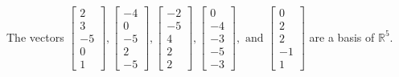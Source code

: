 \begin{exercise}
\begin{exerciseStatement}
  \end{exerciseStatement}
  \begin{exerciseAnswer}
   The vectors \(\left[\begin{array}{r}
2 \\
3 \\
-5 \\
0 \\
1
\end{array}\right] , \left[\begin{array}{r}
-4 \\
0 \\
-5 \\
2 \\
-5
\end{array}\right] , \left[\begin{array}{r}
-2 \\
-5 \\
4 \\
2 \\
2
\end{array}\right] , \left[\begin{array}{r}
0 \\
-4 \\
-3 \\
-5 \\
-3
\end{array}\right] , \text{ and } \left[\begin{array}{r}
0 \\
2 \\
2 \\
-1 \\
1
\end{array}\right]\) 
  	 are  a basis of \(\mathbb{R}^5\).
  


  \end{exerciseAnswer}
\end{exercise}
